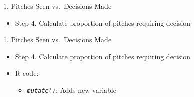 \documentclass[14pt,ignorenonframetext,aspectratio = 1610]{beamer}
\newenvironment{Shaded}{\begin{snugshade}}{\end{snugshade}}
\newcommand{\KeywordTok}[1]{\textcolor[rgb]{0.13,0.29,0.53}{\textbf{{#1}}}}
\newcommand{\DataTypeTok}[1]{\textcolor[rgb]{0.13,0.29,0.53}{{#1}}}
\newcommand{\StringTok}[1]{\textcolor[rgb]{0.31,0.60,0.02}{{#1}}}
\newcommand{\NormalTok}[1]{{#1}}
\providecommand{\tightlist}{%
\setlength{\itemsep}{0pt}\setlength{\parskip}{0pt}}
\begin{document}
\begin{frame}[fragile]{1. Pitches Seen vs.~Decisions Made}

\begin{itemize}
\tightlist
\item
  Step 4. Calculate proportion of pitches requiring decision
\end{itemize}

\footnotesize

\begin{Shaded}
\end{Shaded}

\end{frame}

\begin{frame}[fragile]{1. Pitches Seen vs.~Decisions Made}

\begin{itemize}
\tightlist
\item
  Step 4. Calculate proportion of pitches requiring decision
\item
  R code:

  \begin{itemize}
  \tightlist
  \item
    \emph{\texttt{mutate()}}: Adds new variable
  \end{itemize}
\end{itemize}

\footnotesize

\begin{Shaded}
\end{Shaded}

\end{frame}
\end{document}
